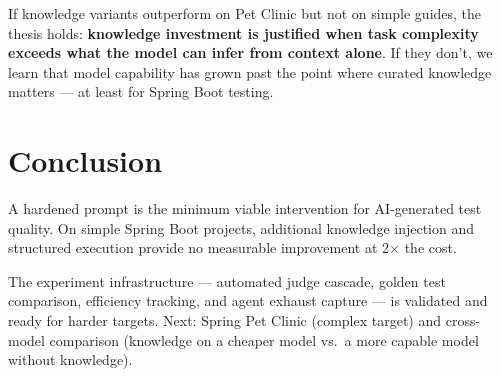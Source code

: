 \documentclass[11pt,a4paper]{article}
\begin{document}
If knowledge variants outperform on Pet Clinic but not on simple guides, the thesis
holds: \textbf{knowledge investment is justified when task complexity exceeds what
the model can infer from context alone}. If they don't, we learn that model
capability has grown past the point where curated knowledge matters --- at least
for Spring Boot testing.

\section{Conclusion}

A hardened prompt is the minimum viable intervention for AI-generated test quality.
On simple Spring Boot projects, additional knowledge injection and structured
execution provide no measurable improvement at 2$\times$ the cost.

The experiment infrastructure --- automated judge cascade, golden test comparison,
efficiency tracking, and agent exhaust capture --- is validated and ready for
harder targets. Next: Spring Pet Clinic (complex target) and cross-model comparison
(knowledge on a cheaper model vs.\ a more capable model without knowledge).
\end{document}
